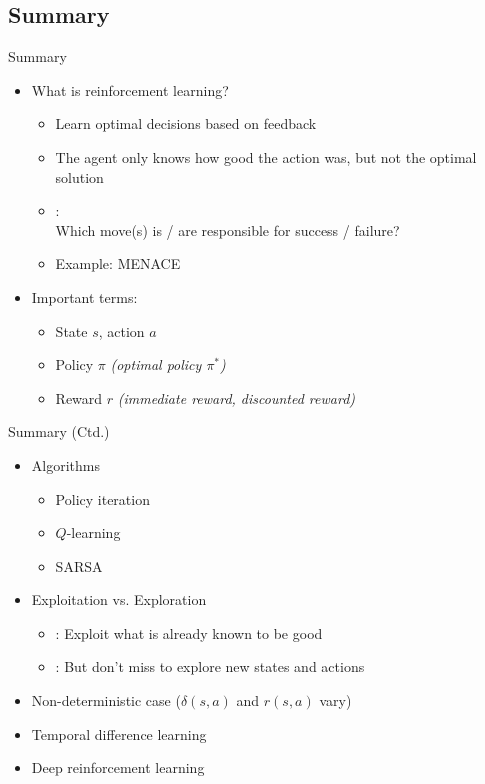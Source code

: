 \subsection{Summary}

\begin{frame}{Summary}{}
	\begin{itemize}
		\item What is reinforcement learning?
		\begin{itemize}
			\item Learn optimal decisions based on feedback
			\item The agent only knows how good the action was, but not the optimal solution
			\item {}: \\
				Which move(s) is / are responsible for success / failure?
			\item Example: MENACE
		\end{itemize}
		\item Important terms:
		\begin{itemize}
			\item State $s$, action $a$
			\item Policy $\pi$ \textit{(optimal policy $\pi^*$)}
			\item Reward $r$ \textit{(immediate reward, discounted reward)}
		\end{itemize}
	\end{itemize}
\end{frame}


\begin{frame}{Summary (Ctd.)}{}
	\begin{itemize}
		\item Algorithms
		\begin{itemize}
			\item Policy iteration
			\item $Q$-learning
			\item SARSA
		\end{itemize}
		\item Exploitation vs. Exploration
		\begin{itemize}
			\item {}: Exploit what is already known to be good
			\item {}: But don't miss to explore new states and actions
		\end{itemize}
		\item Non-deterministic case ($\delta(s, a)$ and $r(s, a)$ vary)
		\item Temporal difference learning
		\item Deep reinforcement learning
	\end{itemize}
\end{frame}


